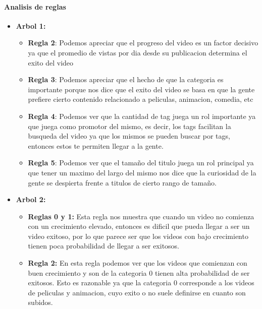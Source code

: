         \paragraph{Analisis de reglas}
            \begin{itemize}
                \item \textbf{Arbol 1:}
                \begin{itemize}
                    \item \textbf{Regla 2}: Podemos apreciar que el progreso
                    del video es un factor decisivo ya que el promedio de vistas
                    por dia desde su publicacion determina el exito del video
                    \item \textbf{Regla 3}: Podemos apreciar que el hecho de que
                    la categoria es importante porque nos dice que el exito del
                    video se basa en que la gente prefiere cierto contenido
                    relacionado a peliculas, animacion, comedia, etc
                    \item \textbf{Regla 4}: Podemos ver que la cantidad de tag
                    juega un rol importante ya que juega como promotor del mismo,
                    es decir, los tags facilitan la busqueda del video ya que los
                    mismos se pueden buscar por tags, entonces estos te permiten
                    llegar a la gente.
                    \item \textbf{Regla 5}: Podemos ver que el tamaño del titulo
                    juega un rol principal ya que tener un maximo del largo del
                    mismo nos dice que la curiosidad de la gente se despierta
                    frente a titulos de cierto rango de tamaño.
                \end{itemize}
                \item \textbf{Arbol 2:}
                \begin{itemize}
                    \item  \textbf{Reglas 0 y 1:} Esta regla nos muestra que
                    cuando un video no comienza con un crecimiento elevado,
                    entonces es dificil que pueda llegar a ser un video exitoso,
                    por lo que parece ser que los videos con bajo crecimiento
                    tienen poca probabilidad de llegar a ser exitosos.

                    \item \textbf{Regla 2:} En esta regla podemos ver que los
                    videos que comienzan con buen crecimiento y son de la
                    categoria 0 tienen alta probabilidad de ser exitosos. Esto
                    es razonable ya que la categoria 0 corresponde a los videos
                    de peliculas y animacion, cuyo exito o no suele definirse
                    en cuanto son subidos.


\end{itemize}
\end{itemize}

